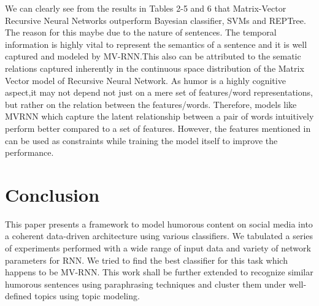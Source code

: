 \documentclass{acm_proc_article-sp}
\begin{document}
We can clearly see from the results in Tables 2-5 and 6 that Matrix-Vector Recursive Neural Networks outperform Bayesian classifier, SVMs and REPTree. The reason for this maybe due to the nature of sentences. The temporal information is highly vital to represent the semantics of a sentence and it is well captured and modeled by MV-RNN.This also can be attributed to the sematic relations captured inherently in the continuous space distribution of the Matrix Vector model of Recursive Neural Network. As humor is a highly cognitive aspect,it may not depend not just on a mere set of features/word representations, but rather on the relation between the features/words. Therefore, models like MVRNN which capture the latent relationship between a pair of words intuitively perform better compared to a set of features. However, the features mentioned in  \cite{zhang2014recognizing} can be used as constraints while training the model itself to improve the performance. 

\section{Conclusion}

This paper presents a framework to model humorous content on social media into a coherent data-driven architecture using various classifiers. We tabulated a series of experiments performed with a wide range of input data and variety of network parameters for RNN. We tried to find the best classifier for this task which happens to be MV-RNN. This work shall be further extended to recognize similar humorous sentences using paraphrasing techniques and cluster them under well-defined topics using topic modeling.




 




%
%












\balancecolumns
\end{document}
